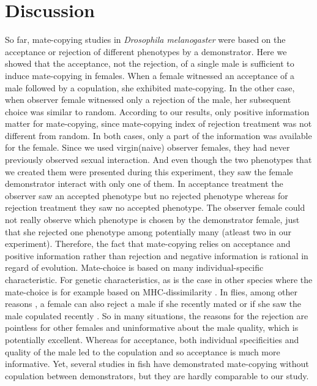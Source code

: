\documentclass[a4paper, 12pt]{article}
\begin{document}
\clearpage
	


\section{Discussion}

So far, mate-copying studies in \textit{Drosophila melanogaster} were based on the acceptance or rejection of different phenotypes by a demonstrator.
Here we showed that the acceptance, not the rejection, of a single male is sufficient to induce mate-copying in females. 
When a female witnessed an acceptance of a male followed by a copulation, she exhibited mate-copying. 
In the other case, when observer female witnessed only a rejection of the male, her subsequent choice was similar to random. 
According to our results, only positive information matter for mate-copying, since mate-copying index of rejection treatment was not different from random.
In both cases, only a part of the information was available for the female. 
Since we used virgin(naive) observer females, they had never previously observed sexual interaction. 
And even though the two phenotypes that we created them were presented during this experiment, they saw the female demonstrator interact with only one of them. 
In acceptance treatment the observer saw an accepted phenotype but no rejected phenotype whereas for rejection treatment they saw no accepted phenotype. 
The observer female could not really observe which phenotype is chosen by the demonstrator female, just that she rejected one phenotype among potentially many (atleast two in our experiment).
Therefore, the fact that mate-copying relies on acceptance and positive information rather than rejection and negative information is rational in regard of evolution.
Mate-choice is based on many individual-specific characteristic. For genetic characteristics, as is the case in other species where the mate-choice is for example based on MHC-dissimilarity \parencite{wedekind_mhc_1995, landry_good_2001}. In flies, among other reasons \parencite{tennant_causes_2014}, a female can also reject a male if she recently mated \parencite{chapman_sex_2003} or if she saw the male copulated recently \parencite{loyau_when_2012}. 
So in many situations, the reasons for the rejection are pointless for other females and uninformative about the male quality, which is potentially excellent.
Whereas for acceptance, both individual specificities and quality of the male led to the copulation and so acceptance is much more informative.
Yet, several studies in fish have demonstrated mate-copying without copulation between demonstrators, but they are hardly comparable to our study. 
\end{document}
